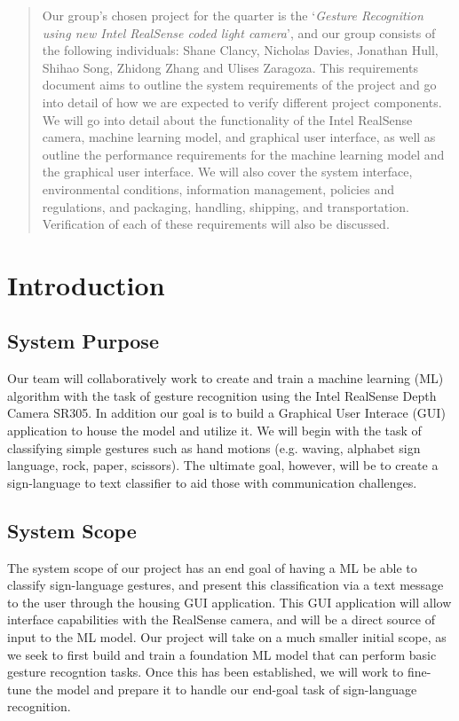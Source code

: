 \documentclass[onecolumn, draftclsnofoot,10pt, compsoc]{IEEEtran}
\begin{document}
\begin{titlepage}
\begin{singlespace}
\begin{abstract}
        	Our group’s chosen project for the quarter is the ‘\textit{Gesture Recognition using new Intel RealSense coded light camera}’, and our group consists of the following individuals: Shane Clancy, Nicholas Davies, Jonathan Hull, Shihao Song, Zhidong Zhang and Ulises Zaragoza. This requirements document aims to outline the system requirements of the project and go into detail of how we are expected to verify different project components. We will go into detail about the functionality of the Intel RealSense camera, machine learning model, and graphical user interface, as well as outline the performance requirements for the machine learning model and the graphical user interface. We will also cover the system interface, environmental conditions, information management, policies and regulations, and packaging, handling, shipping, and transportation. Verification of each of these requirements will also be discussed.
        \end{abstract}     
    \end{singlespace}
\end{titlepage}
\newpage
{}
\tableofcontents
\clearpage

\section{Introduction}

\subsection{System Purpose}
Our team will collaboratively work to create and train a machine learning (ML) algorithm with the task of gesture recognition using the Intel RealSense Depth Camera SR305. 
In addition our goal is to build a Graphical User Interace (GUI) application to house the model and utilize it.
We will begin with the task of classifying simple gestures such as hand motions (e.g. waving, alphabet sign language, rock, paper, scissors).
The ultimate goal, however, will be to create a sign-language to text classifier to aid those with communication challenges.

\subsection{System Scope}
The system scope of our project has an end goal of having a ML be able to classify sign-language gestures, and present this classification via a text message to the user through the housing GUI application. This GUI application will allow interface capabilities with the RealSense camera, and will be a direct source of input to the ML model. Our project will take on a much smaller initial scope, as we seek to first build and train a foundation ML model that can perform basic gesture recogntion tasks. Once this has been established, we will work to fine-tune the model and prepare it to handle our end-goal task of sign-language recognition.
\end{document}
